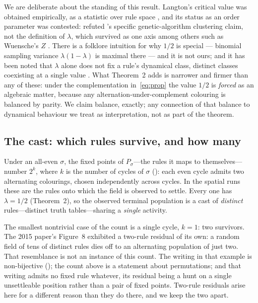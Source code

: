 \documentclass[man,12pt,floatsintext,donotrepeattitle]{apa7}
\newcommand{\sig}{\sigma}
\newcommand{\secref}[1]{\emph{\nameref{#1}}}
\begin{document}
We are deliberate about the standing of this result. Langton's critical
value was obtained empirically, as a statistic over rule space
\parencite{langton1990computation}, and its status as an order parameter
was contested: \textcite{mitchell1993revisiting} refuted
\textcite{packard1988adaptation}'s specific genetic-algorithm clustering
claim, not the definition of $\lambda$, which survived as one axis among
others such as Wuensche's $Z$ \parencite{wuensche1999classifying}. There is
a folklore intuition for why $1/2$ is special --- binomial sampling variance
$\lambda(1-\lambda)$ is maximal there --- and it is not ours; and it has been
noted that $\lambda$ alone does not fix a rule's dynamical class, distinct
classes coexisting at a single value \parencite{sakai2002edge}. What
Theorem~2 adds is narrower and firmer than any of these: under
the complementation in~\eqref{eq:prop} the value $1/2$ is \emph{forced} as an
algebraic matter, because any alternation-under-complement colouring is
balanced by parity. We claim balance, exactly; any connection of that
balance to dynamical behaviour we treat as interpretation, not as part of the
theorem.

\subsection{The cast: which rules survive, and how many}

Under an all-even $\sig$, the fixed points of $P_\sig$---the rules it maps to
themselves---number $2^k$, where $k$ is the number of cycles of $\sig$
(\secref{sec:classification}): each even cycle admits two alternating
colourings, chosen independently across cycles. In the spatial runs these are
the rules onto which the field is observed to settle. Every one has
$\lambda = 1/2$ (Theorem~2), so the observed terminal
population is a cast of \emph{distinct} rules---distinct truth tables---sharing
a \emph{single} activity.

The smallest nontrivial case of the count is a single cycle, $k = 1$: two
survivors. The 2015 paper's Figure~8 exhibited a two-rule residual of its own: a
random field of tens of distinct rules dies off to an alternating population of
just two. That resemblance is not an instance of this count. The writing in that
example is non-bijective (\secref{sec:warmup}); the count above is a statement
about permutations; and that writing admits no fixed rule whatever, its residual
being a hunt on a single unsettleable position rather than a pair of fixed
points. Two-rule residuals arise here for a different reason than they do there,
and we keep the two apart.
\end{document}
